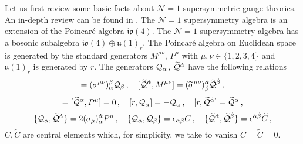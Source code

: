 \documentclass[main.tex]{subfiles}
\begin{document}
Let us first review some basic facts about $\mathcal{N}=1$ supersymmetric gauge theories.  An in-depth review can be found in \cite{Quevedo:2010ui}.  The $\mathcal{N}=1$ supersymmetry algebra is an extension of the Poincar\'e algebra $\mathfrak{io}(4)$.  The $\mathcal{N}=1$ supersymmetry algebra has a bosonic subalgebra $\mathfrak{io}(4)\oplus\mathfrak{u}(1)_r$.  The Poincar\'e algebra on Euclidean space is generated by the standard generators $M^{\mu\nu}$, $P^{\mu}$ with $\mu,\nu\in\{1,2,3,4\}$ and $\mathfrak{u}(1)_r$ is generated by $r$.  The generators $\mathcal{Q}_{\alpha}$, $\widetilde{\mathcal{Q}}^{\dot\alpha}$ have the following relations
\begin{equation}
[\Qfour _{\alpha},M^{\mu\nu}]=(\sigma^{\mu\nu})_{\alpha}^{\beta}\Qfour _{\beta}\,,\quad [\widetilde{\Qfour}^{\dot\alpha},M^{\mu\nu}]=(\widetilde{\sigma}^{\mu\nu})_{\dot\beta}^{\dot\alpha}\widetilde{\Qfour}^{\dot\beta}\,,
\end{equation}
\begin{equation}
[\Qfour_{\alpha},P^{\mu}]=[\widetilde{\Qfour}^{\dot\alpha},P^{\mu}]=0\,,\quad [r,\Qfour_{\alpha}]=-\Qfour_{\alpha}\,,\quad [r,\widetilde{\Qfour}^{\dot\alpha}]=\widetilde{\Qfour}^{\dot\alpha}\,,
\end{equation}
\begin{equation}
\{\mathcal{Q}_{\alpha},\widetilde{\mathcal{Q}}^{\dot\alpha}\}=2(\sigma_{\mu})_{\alpha}^{\dot\alpha}P^{\mu}\,,\quad \{\mathcal{Q}_{\alpha},\mathcal{Q}_{\beta}\}=\epsilon_{\alpha\beta}C\label{eqn:susytrans2}\,,\quad\{\widetilde{\mathcal{Q}}^{\dot\alpha},\widetilde{\mathcal{Q}}^{\dot\beta}\}=\epsilon^{\dot\alpha\dot\beta}\widetilde{C}\,,
\end{equation}
$C,\widetilde{C}$ are central elements which, for simplicity, we take to vanish $C=\widetilde{C}=0$.
\end{document}
